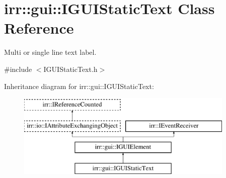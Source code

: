 \hypertarget{classirr_1_1gui_1_1IGUIStaticText}{}\section{irr\+:\+:gui\+:\+:I\+G\+U\+I\+Static\+Text Class Reference}
\label{classirr_1_1gui_1_1IGUIStaticText}


Multi or single line text label.  




{\ttfamily \#include $<$I\+G\+U\+I\+Static\+Text.\+h$>$}

Inheritance diagram for irr\+:\+:gui\+:\+:I\+G\+U\+I\+Static\+Text\+:\begin{figure}[H]
\begin{center}
\leavevmode
\includegraphics[height=4.000000cm]{classirr_1_1gui_1_1IGUIStaticText}
\end{center}
\end{figure}
